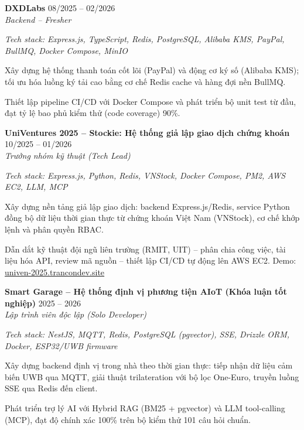 \documentclass[10pt,a4paper]{article}
\renewcommand{\section}[1]{%
  \par\vspace{3.5pt}%
  \noindent{\large\bfseries\color{accentcolor}#1}\par
  \nointerlineskip\vspace{-1pt}%
  \noindent{\color{accentcolor}\rule{\linewidth}{0.8pt}}\par
  \nointerlineskip\vspace{2pt}%
}
\renewenvironment{itemize}
  {\begin{list}{{\color{accentcolor}\small\raisebox{0.1em}{$\bullet$}}}%
     {\setlength{\leftmargin}{1.1em}%
      \setlength{\itemindent}{0pt}%
      \setlength{\itemsep}{1pt}%
      \setlength{\parsep}{0pt}%
      \setlength{\topsep}{1pt}%
      \setlength{\listparindent}{0pt}}%
      \RaggedRight}
  {\end{list}}
\newcommand{\jobheader}[3]{
  \textbf{#1} \hfill #2 \\
  \textit{#3}
}
\newcommand{\techstack}[1]{
  \par{\small\color{stackgray}\textit{Tech stack: #1}}
}
\begin{document}
\jobheader{DXDLabs}{08/2025 -- 02/2026}{Backend -- Fresher}
\techstack{Express.js, TypeScript, Redis, PostgreSQL, Alibaba KMS, PayPal, BullMQ, Docker Compose, MinIO}
\begin{itemize}
  \item Xây dựng hệ thống thanh toán cốt lõi (PayPal) và động cơ ký số (Alibaba KMS); tối ưu hóa luồng ký tải cao bằng cơ chế Redis cache và hàng đợi nền BullMQ.
  \item Thiết lập pipeline CI/CD với Docker Compose và phát triển bộ unit test từ đầu, đạt tỷ lệ bao phủ kiểm thử (code coverage) 90\%.
\end{itemize}

\section{Dự án cá nhân}

\jobheader{UniVentures 2025 -- Stockie: Hệ thống giả lập giao dịch chứng khoán}{10/2025 -- 01/2026}{Trưởng nhóm kỹ thuật (Tech Lead)}
\techstack{Express.js, Python, Redis, VNStock, Docker Compose, PM2, AWS EC2, LLM, MCP}
\begin{itemize}
  \item Xây dựng nền tảng giả lập giao dịch: backend Express.js/Redis, service Python đồng bộ dữ liệu thời gian thực từ chứng khoán Việt Nam (VNStock), cơ chế khớp lệnh và phân quyền RBAC.
  \item Dẫn dắt kỹ thuật đội ngũ liên trường (RMIT, UIT) -- phân chia công việc, tài liệu hóa API, review mã nguồn -- thiết lập CI/CD tự động lên AWS EC2. Demo: \href{https://univen-2025.trancondev.site}{univen-2025.trancondev.site}
\end{itemize}

\jobheader{Smart Garage -- Hệ thống định vị phương tiện AIoT (Khóa luận tốt nghiệp)}{2025 -- 2026}{Lập trình viên độc lập (Solo Developer)}
\techstack{NestJS, MQTT, Redis, PostgreSQL (pgvector), SSE, Drizzle ORM, Docker, ESP32/UWB firmware}
\begin{itemize}
  \item Xây dựng backend định vị trong nhà theo thời gian thực: tiếp nhận dữ liệu cảm biến UWB qua MQTT, giải thuật trilateration với bộ lọc One-Euro, truyền luồng SSE qua Redis đến client.
  \item Phát triển trợ lý AI với Hybrid RAG (BM25 + pgvector) và LLM tool-calling (MCP), đạt độ chính xác 100\% trên bộ kiểm thử 101 câu hỏi chuẩn.
\end{itemize}
\end{document}
